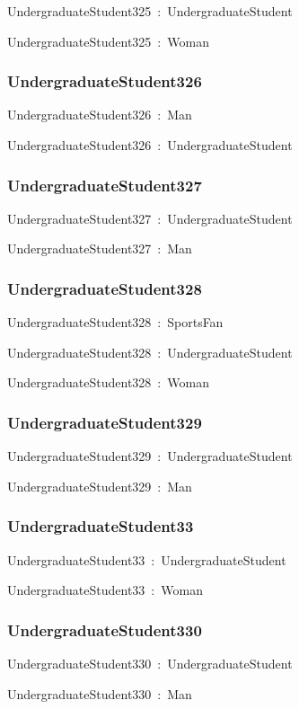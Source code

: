 \documentclass{article}
\begin{document}
UndergraduateStudent325~:~UndergraduateStudent

UndergraduateStudent325~:~Woman

\subsubsection*{UndergraduateStudent326}

UndergraduateStudent326~:~Man

UndergraduateStudent326~:~UndergraduateStudent

\subsubsection*{UndergraduateStudent327}

UndergraduateStudent327~:~UndergraduateStudent

UndergraduateStudent327~:~Man

\subsubsection*{UndergraduateStudent328}

UndergraduateStudent328~:~SportsFan

UndergraduateStudent328~:~UndergraduateStudent

UndergraduateStudent328~:~Woman

\subsubsection*{UndergraduateStudent329}

UndergraduateStudent329~:~UndergraduateStudent

UndergraduateStudent329~:~Man

\subsubsection*{UndergraduateStudent33}

UndergraduateStudent33~:~UndergraduateStudent

UndergraduateStudent33~:~Woman

\subsubsection*{UndergraduateStudent330}

UndergraduateStudent330~:~UndergraduateStudent

UndergraduateStudent330~:~Man
\end{document}
